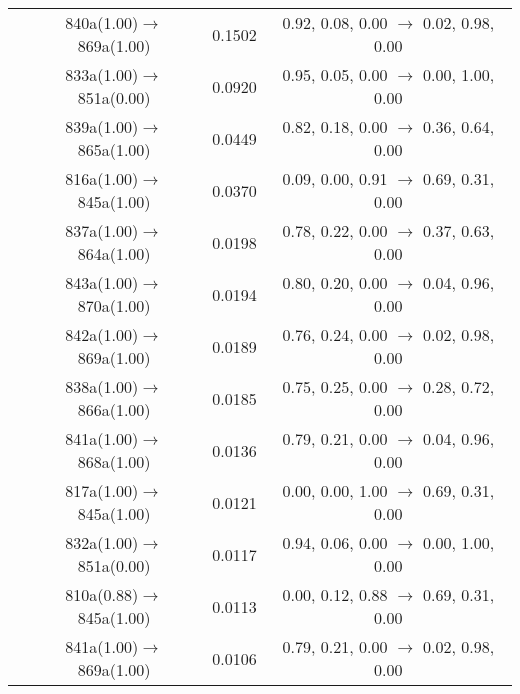 \documentclass[10pt,a4paper]{article}
\begin{document}
\begin{longtable}{c|c|c|c}
 	& 840a(1.00)$\rightarrow$869a(1.00) &	 0.1502 &	 0.92, 0.08, 0.00 $\rightarrow$ 0.02, 0.98, 0.00 \\ 
 	& 833a(1.00)$\rightarrow$851a(0.00) &	 0.0920 &	 0.95, 0.05, 0.00 $\rightarrow$ 0.00, 1.00, 0.00 \\ 
 	& 839a(1.00)$\rightarrow$865a(1.00) &	 0.0449 &	 0.82, 0.18, 0.00 $\rightarrow$ 0.36, 0.64, 0.00 \\ 
 	& 816a(1.00)$\rightarrow$845a(1.00) &	 0.0370 &	 0.09, 0.00, 0.91 $\rightarrow$ 0.69, 0.31, 0.00 \\ 
 	& 837a(1.00)$\rightarrow$864a(1.00) &	 0.0198 &	 0.78, 0.22, 0.00 $\rightarrow$ 0.37, 0.63, 0.00 \\ 
 	& 843a(1.00)$\rightarrow$870a(1.00) &	 0.0194 &	 0.80, 0.20, 0.00 $\rightarrow$ 0.04, 0.96, 0.00 \\ 
 	& 842a(1.00)$\rightarrow$869a(1.00) &	 0.0189 &	 0.76, 0.24, 0.00 $\rightarrow$ 0.02, 0.98, 0.00 \\ 
 	& 838a(1.00)$\rightarrow$866a(1.00) &	 0.0185 &	 0.75, 0.25, 0.00 $\rightarrow$ 0.28, 0.72, 0.00 \\ 
 	& 841a(1.00)$\rightarrow$868a(1.00) &	 0.0136 &	 0.79, 0.21, 0.00 $\rightarrow$ 0.04, 0.96, 0.00 \\ 
 	& 817a(1.00)$\rightarrow$845a(1.00) &	 0.0121 &	 0.00, 0.00, 1.00 $\rightarrow$ 0.69, 0.31, 0.00 \\ 
 	& 832a(1.00)$\rightarrow$851a(0.00) &	 0.0117 &	 0.94, 0.06, 0.00 $\rightarrow$ 0.00, 1.00, 0.00 \\ 
 	& 810a(0.88)$\rightarrow$845a(1.00) &	 0.0113 &	 0.00, 0.12, 0.88 $\rightarrow$ 0.69, 0.31, 0.00 \\ 
 	& 841a(1.00)$\rightarrow$869a(1.00) &	 0.0106 &	 0.79, 0.21, 0.00 $\rightarrow$ 0.02, 0.98, 0.00 \\ 
 \hline %
 \end{longtable} 
 
\end{document}
